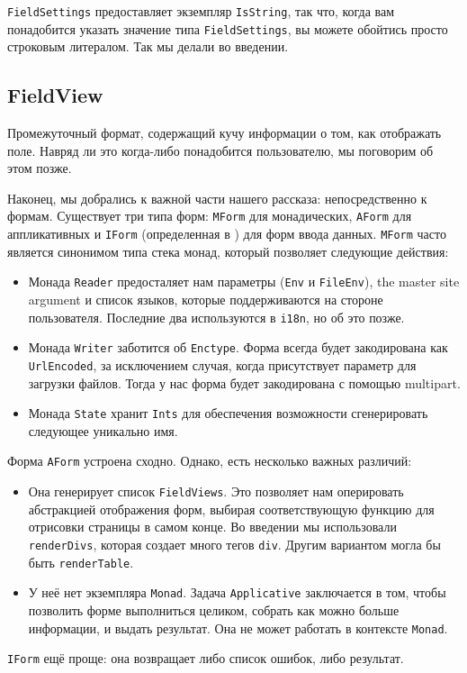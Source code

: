 \begin{remark}
\lstinline'FieldSettings' предоставляет экземпляр \lstinline'IsString', так что, 
когда вам понадобится указать значение типа \lstinline'FieldSettings', вы можете 
обойтись просто строковым литералом. Так мы делали во введении.
\end{remark}

\subsection{FieldView}
Промежуточный формат, содержащий кучу информации о том, как отображать поле. 
Навряд ли это когда-либо понадобится пользователю, мы поговорим об этом позже.



Наконец, мы добрались к важной части нашего рассказа: непосредственно к формам. Существует
три типа форм: \lstinline'MForm' для монадических, \lstinline'AForm' для аппликативных и
\lstinline'IForm' (определенная в 
) 
для форм ввода данных. \lstinline'MForm' часто является синонимом типа стека 
монад, который позволяет следующие действия:

\begin{itemize}
\item Монада \lstinline'Reader' предосталяет нам параметры (\lstinline'Env' и 
\lstinline'FileEnv'), the master site argument и список языков, 
которые поддерживаются на
стороне пользователя. Последние два используются в \lstinline'i18n', но об это позже.

\item Монада \lstinline'Writer' заботится об \lstinline'Enctype'. Форма всегда будет 
закодирована как  \lstinline'UrlEncoded', за исключением случая, когда присутствует
параметр для загрузки файлов. Тогда у нас форма будет закодирована с помощью multipart.
\item Монада \lstinline'State' хранит \lstinline'Ints' для обеспечения возможности
сгенерировать следующее уникально имя.
\end{itemize}
Форма \lstinline'AForm' устроена сходно. Однако, есть несколько важных различий:
\begin{itemize}
\item Она генерирует список \lstinline'FieldViews'. Это позволяет нам оперировать
абстракцией отображения форм, выбирая соответствующую функцию для отрисовки страницы в
самом конце. Во введении мы использовали \lstinline'renderDivs', которая создает
много тегов \lstinline'div'. Другим вариантом могла бы быть 
\lstinline'renderTable'.

\item У неё нет экземпляра \lstinline'Monad'. Задача \lstinline'Applicative' заключается
в том, чтобы позволить форме выполниться целиком, собрать как можно больше информации, и
выдать результат. Она не может работать в контексте \lstinline'Monad'.
\end{itemize}
\lstinline'IForm' ещё проще: она возвращает либо список ошибок, либо результат.


